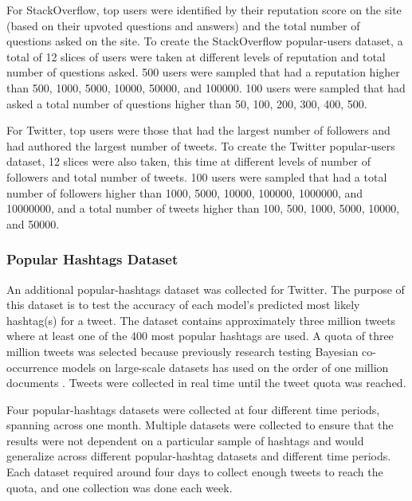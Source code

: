 \documentclass[man,floatsintext,donotrepeattitle]{apa6}
\begin{document}
For StackOverflow, top users were identified by their reputation score on the site (based on their upvoted questions and answers) and the total number of questions asked on the site.
To create the StackOverflow popular-users dataset, a total of 12 slices of users were taken at different levels of reputation and total number of questions asked.
500 users were sampled that had a reputation higher than \num{500}, \num{1000}, \num{5000}, \num{10000}, \num{50000}, and \num{100000}.
100 users were sampled that had asked a total number of questions higher than \num{50}, \num{100}, \num{200}, \num{300}, \num{400}, \num{500}.

For Twitter, top users were those that had the largest number of followers and had authored the largest number of tweets.
To create the Twitter popular-users dataset, 12 slices were also taken, this time at different levels of number of followers and total number of tweets.
100 users were sampled that had a total number of followers higher than \num{1000}, \num{5000}, \num{10000}, \num{100000}, \num{1000000}, and \num{10000000},
and a total number of tweets higher than \num{100}, \num{500}, \num{1000}, \num{5000}, \num{10000}, and \num{50000}.

\subsubsection{Popular Hashtags Dataset}

An additional popular-hashtags dataset was collected for Twitter.
The purpose of this dataset is to test the accuracy of each model's predicted most likely hashtag(s) for a tweet.
The dataset contains approximately three million tweets where at least one of the 400 most popular hashtags are used.
A quota of three million tweets was selected because previously research testing Bayesian co-occurrence models on large-scale datasets has used on the order of one million documents
\parencites{Stanley2013,Douglass2010,Budiu2007,Kuo2011}.
Tweets were collected in real time until the tweet quota was reached.

Four popular-hashtags datasets were collected at four different time periods, spanning across one month.
Multiple datasets were collected to ensure that the results were not dependent on a particular sample of hashtags and would generalize across different popular-hashtag datasets and different time periods.
Each dataset required around four days to collect enough tweets to reach the quota, and one collection was done each week.
\end{document}
